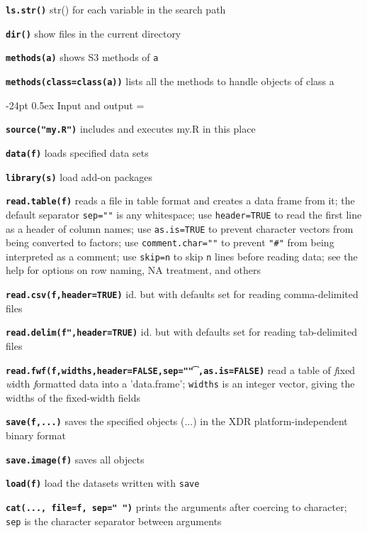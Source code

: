 \documentclass[8pt,landscape]{article}
\makeatletter
\renewcommand\section{\@startsection{section}{1}{0mm}%
                                     {-24pt}%
                                     {0.5ex}%
                                {\color{blue}\normalfont\large\bfseries}}
\newcommand{\code}{\texttt}
\newcommand{\bcode}[1]{\texttt{\textbf{#1}}}
\makeatother
\begin{document}
\begin{multicols*}{3}
\bcode{ls.str()} str() for each variable in the search path

\bcode{dir()} show files in the current directory

\bcode{methods(a)} shows S3 methods of \code{a}

\bcode{methods(class=class(a))} lists all the methods to handle objects
of class a




\section{Input and output}
\everypar={\hangindent=9mm}

\bcode{source("my.R")} includes and executes my.R in this place

\bcode{data(f)} loads specified data sets

\bcode{library(s)} load add-on packages

\bcode{read.table(f)} reads a file in table format and
                creates a data frame from it; the default separator
                \code{sep=""} is any whitespace; use \code{header=TRUE}
                to read the first line as a header of column names; use \code{as.is=TRUE} to
                prevent character vectors from being converted to
                factors; use \code{comment.char=""} to prevent
                \code{"\#"} from being interpreted as a comment; use
                \code{skip=n} to skip \code{n} lines before reading data; see
                the help for options on row naming, NA treatment, and
                others

\bcode{read.csv(f,header=TRUE)} id. but with defaults set for reading
comma-delimited files

\bcode{read.delim(f",header=TRUE)} id. but with defaults set for reading
tab-delimited files

\bcode{read.fwf(f,widths,header=FALSE,sep="\t",as.is=FALSE)} read a table of \emph{f}ixed \emph{w}idth \emph{f}ormatted data into a
     'data.frame'; \code{widths} is an integer vector, giving the widths of the fixed-width fields


\bcode{save(f,...)} saves the specified objects (...) in the XDR
platform-independent binary format

\bcode{save.image(f)} saves all objects

\bcode{load(f)} load the datasets written with \code{save}


\bcode{cat(..., file=f, sep=" ")} prints the arguments after coercing to
character; \code{sep} is the character separator between arguments


\end{multicols*}
\end{document}
